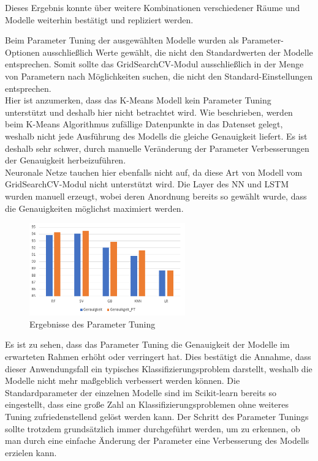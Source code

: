 Dieses Ergebnis konnte über weitere Kombinationen verschiedener Räume und Modelle weiterhin
bestätigt und repliziert werden. 

\newpage
Beim Parameter Tuning der ausgewählten Modelle wurden als Parameter-Optionen ausschließlich Werte gewählt, die nicht 
den Standardwerten der Modelle entsprechen. Somit sollte das GridSearchCV-Modul ausschließlich in der Menge 
von Parametern nach Möglichkeiten suchen, die nicht den Standard-Einstellungen entsprechen.\\
Hier ist anzumerken, dass das K-Means Modell kein Parameter Tuning unterstützt und deshalb hier nicht 
betrachtet wird. Wie beschrieben, werden beim K-Means Algorithmus zufällige Datenpunkte in das Datenset
gelegt, weshalb nicht jede Ausführung des Modells die gleiche Genauigkeit liefert. Es ist deshalb sehr schwer,
durch manuelle Veränderung der Parameter Verbesserungen der Genauigkeit herbeizuführen.\\
Neuronale Netze tauchen hier ebenfalls nicht auf, da diese Art von Modell vom GridSearchCV-Modul nicht
unterstützt wird. Die Layer des NN und LSTM wurden manuell erzeugt, wobei deren Anordnung bereits so
gewählt wurde, dass die Genauigkeiten möglichst maximiert werden.

\begin{figure}[h]
    \centering
    \includegraphics[width=0.6\textwidth]{pic/param_eval.png}
    \caption{Ergebnisse des Parameter Tuning}
    \label{fig:PT_eval}
\end{figure}

Es ist zu sehen, dass das Parameter Tuning die Genauigkeit der Modelle im erwarteten Rahmen erhöht oder 
verringert hat. Dies bestätigt die Annahme, dass dieser Anwendungsfall ein typisches Klassifizierungsproblem 
darstellt, weshalb die Modelle nicht mehr maßgeblich verbessert werden können. Die Standardparameter der 
einzelnen Modelle sind im Scikit-learn bereits so eingestellt, dass eine große Zahl an Klassifizierungsproblemen
ohne weiteres Tuning zufriedenstellend gelöst werden kann.
Der Schritt des Parameter Tunings 
sollte trotzdem grundsätzlich immer durchgeführt werden, um zu erkennen, ob man durch eine einfache Änderung 
der Parameter eine Verbesserung des Modells erzielen kann.\\

